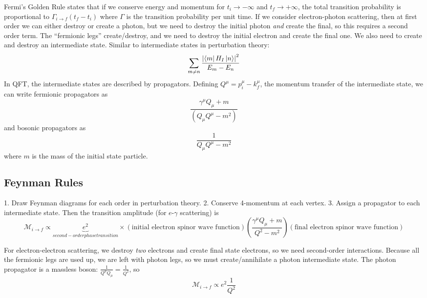 \documentclass[a4paper,twoside,master.tex]{subfiles}
\begin{document}
Fermi's Golden Rule states that if we conserve energy and momentum for $ t_i \to - \infty $ and $ t_f \to + \infty $, the total transition probability is proportional to $ \Gamma_{i \to f}(t_f - t_i) $ where $ \Gamma $ is the transition probability per unit time. If we consider electron-photon scattering, then at first order we can either destroy or create a photon, but we need to destroy the initial photon \textit{and} create the final, so this requires a second order term. The ``fermionic legs'' create/destroy, and we need to destroy the initial electron and create the final one. We also need to create and destroy an intermediate state. Similar to intermediate states in perturbation theory:
\begin{equation}
    \sum_{m \neq n} \frac{\abs{\bra{m} H_I\ket{n}}^2}{E_m - E_n}
\end{equation}
In QFT, the intermediate states are described by propagators. Defining $ Q^{\mu} = p_i^{\mu} - k_f^{\mu} $, the momentum transfer of the intermediate state, we can write fermionic propagators as
\begin{equation}
    \frac{\gamma^{\mu} Q_{\mu} + m}{(Q_{\mu} Q^{\mu} - m^2)}
\end{equation}
and bosonic propagators as
\begin{equation}
    \frac{1}{Q_{\mu} Q^{\mu} - m^2}
\end{equation}
where $ m $ is the mass of the initial state particle.

\subsection{Feynman Rules}\label{sub:feynman_rules}

1. Draw Feynman diagrams for each order in perturbation theory. 2. Conserve 4-momentum at each vertex. 3. Assign a propagator to each intermediate state. Then the transition amplitude (for $ e $-$\gamma$ scattering) is
\begin{equation}
    \mathcal{M}_{i \to f} \propto \underbrace{e^2}_{second-order phase transition} \times \left( \text{initial electron spinor wave function} \right) \left( \frac{\gamma^{\mu} Q_{\mu} + m}{Q^2 - m^2} \right) \left( \text{final electron spinor wave function} \right)
\end{equation}

For electron-electron scattering, we destroy \textit{two} electrons and create  final state electrons, so we need second-order interactions. Because all the fermionic legs are used up, we are left with photon legs, so we must create/annihilate a photon intermediate state. The photon propagator is a massless boson: $ \frac{1}{Q^{\mu} Q_{\mu}} = \frac{1}{Q^2} $, so
\begin{equation}
    \mathcal{M}_{i \to f} \propto e^2 \frac{1}{Q^2}
\end{equation}
\end{document}
